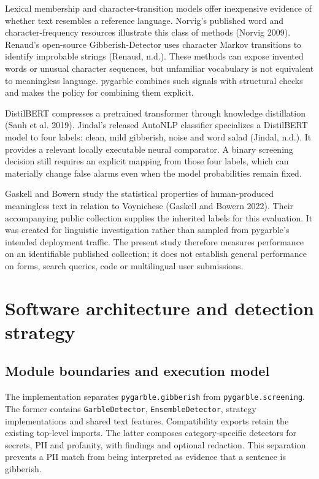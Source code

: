 \documentclass[10pt,a4paper,twocolumn]{article}
\begin{document}
Lexical membership and character-transition models offer inexpensive
evidence of whether text resembles a reference language. Norvig's
published word and character-frequency resources illustrate this class
of methods (Norvig 2009). Renaud's open-source Gibberish-Detector uses
character Markov transitions to identify improbable strings (Renaud,
n.d.). These methods can expose invented words or unusual character
sequences, but unfamiliar vocabulary is not equivalent to meaningless
language. pygarble combines such signals with structural checks and
makes the policy for combining them explicit.

DistilBERT compresses a pretrained transformer through knowledge
distillation (Sanh et al. 2019). Jindal's released AutoNLP classifier
specializes a DistilBERT model to four labels: clean, mild gibberish,
noise and word salad (Jindal, n.d.). It provides a relevant locally
executable neural comparator. A binary screening decision still requires
an explicit mapping from those four labels, which can materially change
false alarms even when the model probabilities remain fixed.

Gaskell and Bowern study the statistical properties of human-produced
meaningless text in relation to Voynichese (Gaskell and Bowern 2022).
Their accompanying public collection supplies the inherited labels for
this evaluation. It was created for linguistic investigation rather than
sampled from pygarble's intended deployment traffic. The present study
therefore measures performance on an identifiable published collection;
it does not establish general performance on forms, search queries, code
or multilingual user submissions.

\section{Software architecture and detection
strategy}\label{software-architecture-and-detection-strategy}

\subsection{Module boundaries and execution
model}\label{module-boundaries-and-execution-model}

The implementation separates \texttt{pygarble.gibberish} from
\texttt{pygarble.screening}. The former contains
\texttt{GarbleDetector}, \texttt{EnsembleDetector}, strategy
implementations and shared text features. Compatibility exports retain
the existing top-level imports. The latter composes category-specific
detectors for secrets, PII and profanity, with findings and optional
redaction. This separation prevents a PII match from being interpreted
as evidence that a sentence is gibberish.
\end{document}
